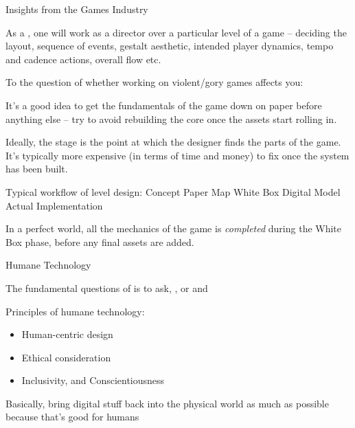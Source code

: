\documentclass[11pt]{article}
\begin{document}
\begin{topic}{Insights from the Games Industry}
	\item As a , one will work as a director over a particular level of a game -- deciding the layout, sequence of events, gestalt aesthetic, intended player dynamics, tempo and cadence actions, overall flow etc.
	\item To the question of whether working on violent/gory games affects you: 
	\item It's a good idea to get the fundamentals of the game down on paper before anything else -- try to avoid rebuilding the core once the  assets start rolling in.
	\item Ideally, the  stage is the point at which the designer finds the  parts of the game. It's typically more expensive (in terms of time and money) to fix once the system has been built.
	\item Typical workflow of level design: Concept \textrightarrow Paper Map \textrightarrow White Box Digital Model \textrightarrow Actual Implementation
	\item In a perfect world, all the mechanics of the game is \textit{completed} during the White Box phase, before any final assets are added.
\end{topic}

\begin{topic}{Humane Technology}
	\item The fundamental questions of  is to ask, , or  and 
	\item Principles of humane technology:
	\begin{itemize}
		\item Human-centric design
		\item Ethical consideration
		\item Inclusivity, and Conscientiousness
	\end{itemize}
	\item Basically, bring digital stuff back into the physical world as much as possible because that's good for humans
\end{topic}
\end{document}
